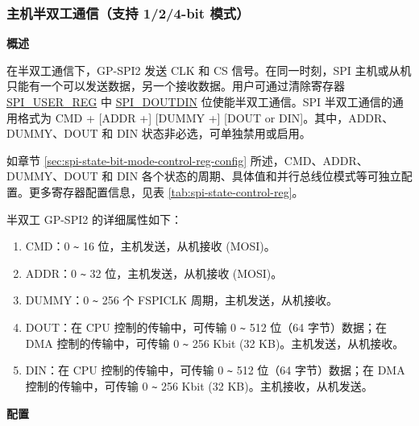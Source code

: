 \documentclass[main\_\_CN.tex]{subfiles}
\begin{document}
\subsubsection{主机半双工通信（支持 1/2/4-bit 模式）}
\label{para:spi-half-duplex-comm}

\textbf{概述}

在半双工通信下，GP-SPI2 发送 CLK 和 CS 信号。在同一时刻，SPI 主机或从机只能有一个可以发送数据，另一个接收数据。用户可通过清除寄存器 \hyperref[regdesc:SPIUSERREG]{SPI\_USER\_REG} 中 \hyperref[fielddesc:SPIDOUTDIN]{SPI\_DOUTDIN} 位使能半双工通信。SPI 半双工通信的通用格式为 CMD + [ADDR +] [DUMMY +] [DOUT or DIN]。其中，ADDR、DUMMY、DOUT 和 DIN 状态非必选，可单独禁用或启用。

如章节  \ref{sec:spi-state-bit-mode-control-reg-config} 所述，CMD、ADDR、DUMMY、DOUT 和 DIN 各个状态的周期、具体值和并行总线位模式等可独立配置。更多寄存器配置信息，见表  \ref{tab:spi-state-control-reg}。

半双工 GP-SPI2 的详细属性如下：

\begin{enumerate}
    \item CMD：0 \verb+~+ 16 位，主机发送，从机接收 (MOSI)。
    \item ADDR：0 \verb+~+ 32 位，主机发送，从机接收 (MOSI)。
    \item DUMMY：0 \verb+~+ 256 个 FSPICLK 周期，主机发送，从机接收。
    \item DOUT：在 CPU 控制的传输中，可传输 0 \verb+~+ 512 位（64 字节）数据；在 DMA 控制的传输中，可传输 0 \verb+~+ 256 Kbit (32 KB)。主机发送，从机接收。

    \item DIN：在 CPU 控制的传输中，可传输 0 \verb+~+ 512 位（64 字节）数据；在 DMA 控制的传输中，可传输 0 \verb+~+ 256 Kbit (32 KB)。主机接收，从机发送。
\end{enumerate}

\textbf{配置}
\end{document}
